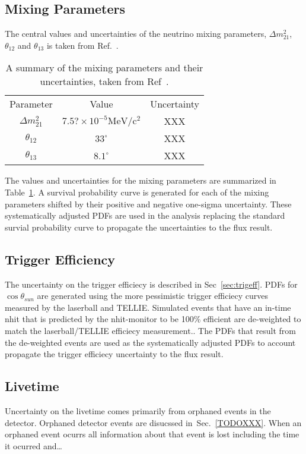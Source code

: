 \subsection{Mixing Parameters}
The central values and uncertainties of the neutrino mixing parameters, $\Delta
m^{2}_{21}$, $\theta_{12}$ and $\theta_{13}$ is taken from Ref.~\cite{PDG2016}.
\begin{table}
    \centering
    \begin{tabular}{c c c}
        Parameter & Value & Uncertainty\\
        $\Delta m^{2}_{21}$ & $7.5?\times10^{-5} \mathrm{MeV}/\mathrm{c}^{2}$ & XXX\\
        $\theta_{12}$ & $33^{\circ}$ & XXX \\
        $\theta_{13}$ & $8.1^{\circ}$ & XXX\\
    \end{tabular}
    \caption{A summary of the mixing parameters and their uncertainties, taken
    from Ref~\cite{PDG2016}.}
\label{tbl:mixing_values}
\end{table}
The values and uncertainties for the mixing parameters
are summarized in Table~\ref{tbl:mixing_values}.
A survival probability curve is generated for each of the mixing parameters
shifted by their positive and negative one-sigma uncertainty.
These systematically adjusted PDFs are used in the analysis replacing the
standard survial probability curve to propagate the uncertainties to the
flux result.
\subsection{Trigger Efficiency}
The uncertainty on the trigger efficiecy is described in Sec~\ref{sec:trigeff}.
PDFs for $\cos\theta_{sun}$ are generated using the more pessimistic
trigger efficiecy curves measured by the laserball and TELLIE\@.
Simulated events that have an in-time nhit that is predicted by the nhit-monitor
to be 100\% efficient are de-weighted to match the laserball/TELLIE efficiecy
measurement..
The PDFs that result from the de-weighted events are used as the systematically
adjusted PDFs to account propagate the trigger efficiecy uncertainty to the
flux result.
\subsection{Livetime}
Uncertainty on the livetime comes primarily from orphaned events in the detector.
Orphaned detector events are disucssed in~Sec.~\ref{TODOXXX}.
When an orphaned event ocurrs all information about that event is lost including
the time it ocurred and\ldots%

